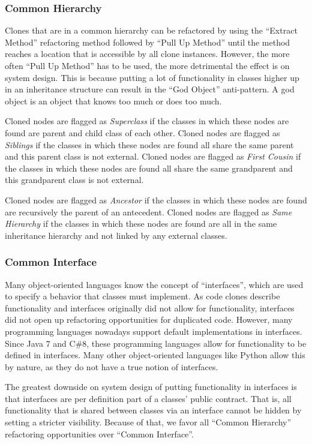 \subsubsection{Common Hierarchy}
Clones that are in a common hierarchy can be refactored by using the ``Extract Method'' refactoring method followed by ``Pull Up Method'' until the method reaches a location that is accessible by all clone instances. However, the more often ``Pull Up Method'' has to be used, the more detrimental the effect is on system design. This is because putting a lot of functionality in classes higher up in an inheritance structure can result in the ``God Object'' anti-pattern. A god object is an object that knows too much or does too much.

Cloned nodes are flagged as \textit{Superclass} if the classes in which these nodes are found are parent and child class of each other. Cloned nodes are flagged as \textit{Siblings} if the classes in which these nodes are found all share the same parent and this parent class is not external. Cloned nodes are flagged as \textit{First Cousin} if the classes in which these nodes are found all share the same grandparent and this grandparent class is not external.

Cloned nodes are flagged as \textit{Ancestor} if the classes in which these nodes are found are recursively the parent of an antecedent. Cloned nodes are flagged as \textit{Same Hierarchy} if the classes in which these nodes are found are all in the same inheritance hierarchy and not linked by any external classes.

\subsubsection{Common Interface}
Many object-oriented languages know the concept of ``interfaces'', which are used to specify a behavior that classes must implement. As code clones describe functionality and interfaces originally did not allow for functionality, interfaces did not open up refactoring opportunities for duplicated code. However, many programming languages nowadays support default implementations in interfaces. Since Java 7 and C\#8, these programming languages allow for functionality to be defined in interfaces. Many other object-oriented languages like Python allow this by nature, as they do not have a true notion of interfaces.

The greatest downside on system design of putting functionality in interfaces is that interfaces are per definition part of a classes' public contract. That is, all functionality that is shared between classes via an interface cannot be hidden by setting a stricter visibility. Because of that, we favor all ``Common Hierarchy'' refactoring opportunities over ``Common Interface''.

